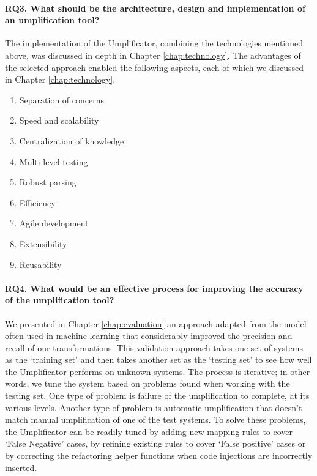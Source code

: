 \paragraph*{RQ3. What should be the architecture, design and implementation of an umplification tool?}

The implementation of the Umplificator, combining the technologies mentioned above, was discussed in depth in Chapter \ref{chap:technology}. The advantages of the selected approach enabled the following aspects, each of which we discussed in Chapter \ref{chap:technology}.

\begin{enumerate}

\item Separation of concerns

\item Speed and scalability

\item Centralization of knowledge

\item Multi-level testing

\item Robust parsing 

\item Efficiency

\item Agile development 

\item Extensibility

\item Reusability

\end{enumerate}

\paragraph*{RQ4. What would be an effective process for improving the accuracy of the umplification tool?}

We presented in Chapter \ref{chap:evaluation} an approach adapted from the model often used in machine learning that  considerably improved the precision and recall of our transformations. This validation approach takes one set of systems as the `training set' and then takes another set as the `testing set' to see how well the Umplificator performs on unknown systems. The process is iterative; in other words, we tune the system based on problems found when working with the testing set. 
One type of problem is  failure of the umplification to complete, at its various levels. Another type of problem is automatic umplification that doesn't match manual umplification of one of the test systems. To solve these problems, the Umplificator can be readily tuned by adding new mapping rules to cover `False Negative' cases, by refining existing rules to cover `False positive' cases or by correcting the refactoring helper functions when code injections are incorrectly inserted.

